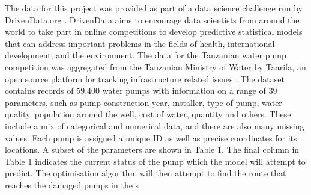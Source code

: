 \documentclass{article} %
\begin{document}
\begin{multicols}{2}
The data for this project was provided as part of a data science challenge run by DrivenData.org \cite{DrivenData2015}. DrivenData aims to encourage data scientists from around the world to take part in online competitions to develop predictive statistical models that can address important problems in the fields of health, international development, and the environment. The data for the Tanzanian water pump competition was aggregated from the Tanzanian Ministry of Water by Taarifa, an open source platform for tracking infrastructure related issues \cite{Taarifa2015}.  The dataset contains records of 59,400 water pumps with information on a range of 39 parameters, such as pump construction year, installer, type of pump, water quality, population around the well, cost of water, quantity and others. These include a mix of categorical and numerical data, and there are also many missing values. Each pump is assigned a unique ID as well as precise coordinates for its locations. A subset of the parameters are shown in Table 1. The final column in Table 1 indicates the current status of the pump which the model will attempt to predict. The optimisation algorithm will then attempt to find the route that reaches the damaged pumps in the s

\begin{table}
\caption{Sample of the DrivenData Tanzania water wells dataset}
\centering
{}
\end{table}



\end{multicols}
\end{document}
